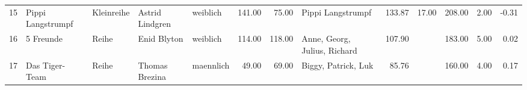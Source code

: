 \begin{sidewaystable}[ht]
\begin{center}
{\begin{tabular}{rllllrrlrrrrr}
  15 & Pippi Langstrumpf                                                                                                                                                                                                                                               & Kleinreihe & Astrid Lindgren                                                                                                                                                                                                                                                 & weiblich & 141.00 & 75.00 & Pippi Langstrumpf                                                                                                                                                                                                                                               & 133.87 & 17.00 & 208.00 & 2.00 & -0.31 \\ 
  16 & 5 Freunde                                                                                                                                                                                                                                                       & Reihe & Enid Blyton                                                                                                                                                                                                                                                     & weiblich & 114.00 & 118.00 & Anne, Georg, Julius, Richard                                                                                                                                                                                                                                    & 107.90 &  & 183.00 & 5.00 & 0.02 \\ 
  17 & Das Tiger- Team                                                                                                                                                                                                                                                 & Reihe & Thomas Brezina                                                                                                                                                                                                                                                  & maennlich & 49.00 & 69.00 & Biggy, Patrick, Luk                                                                                                                                                                                                                                             & 85.76 &  & 160.00 & 4.00 & 0.17 \\ 

\end{tabular}}
\end{center}
\end{sidewaystable}
